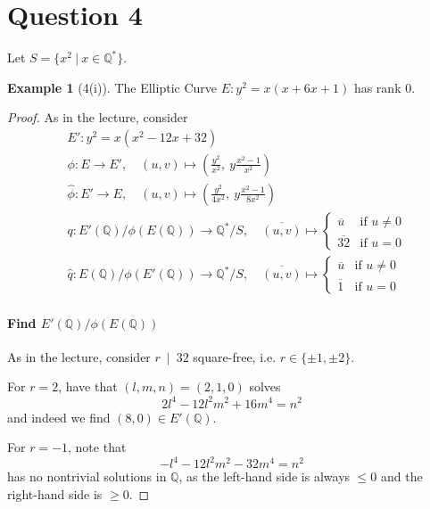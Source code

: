 \documentclass{scrartcl}
\newcommand{\Q}{\mathbb{Q}}
\newcommand{\divides}{\ \mid \ }
\theoremstyle{definition}
\newtheorem{example}[subsection]{Example}
\begin{document}
\section{Question 4}

Let $S = \{ x^2 \ | \ x \in \Q^* \}$.
\begin{example}[4(i)]
    \label{ex:4i}
    The Elliptic Curve $E: y^2 = x(x + 6x + 1)$ has rank $0$.
\end{example}
\begin{proof}
    As in the lecture, consider
    \begin{align*}
        &E': y^2 = x(x^2 - 12x + 32) \\
        &\phi: E \to E', \quad (u, v) \mapsto \left( \frac {y^2} {x^2}, \ y \frac {x^2 - 1} {x^2} \right) \\
        &\hat{\phi}: E' \to E, \quad (u, v) \mapsto \left( \frac {y^2} {4x^2}, \ y \frac {x^2 - 1} {8x^2} \right) \\
        &q: E'(\Q)/\phi(E(\Q)) \to \Q^*/S, \quad \overline{(u, v)} \mapsto \begin{cases}
            \overline{u} & \text{if $u \neq 0$} \\
            \overline{32} & \text{if $u = 0$}
        \end{cases} \\
        &\hat{q}: E(\Q)/\phi(E'(\Q)) \to \Q^*/S, \quad \overline{(u, v)} \mapsto \begin{cases}
            \overline{u} & \text{if $u \neq 0$} \\
            \overline{1} & \text{if $u = 0$}
        \end{cases}
    \end{align*}
    \paragraph{Find $E'(\Q)/\phi(E(\Q))$} As in the lecture, consider $r \divides 32$ square-free, i.e. $r \in \{ \pm 1, \pm 2 \}$.

    For $r = 2$, have that $(l, m, n) = (2, 1, 0)$ solves
    \begin{equation*}
        2l^4 - 12l^2m^2 + 16m^4 = n^2
    \end{equation*}
    and indeed we find $(8, 0) \in E'(\Q)$.

    For $r = -1$, note that
    \begin{equation*}
        -l^4 - 12l^2m^2 - 32m^4 = n^2
    \end{equation*}
    has no nontrivial solutions in $\Q$, as the left-hand side is always $\leq 0$ and the right-hand side is $\geq 0$.


\end{proof}
\end{document}
